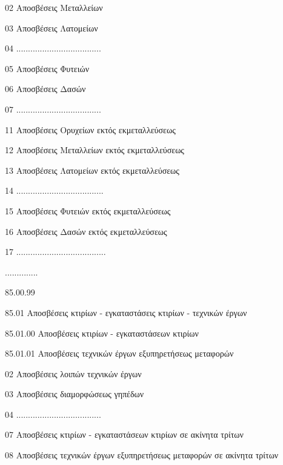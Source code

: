 \documentclass[A4,10pt,greek]{book}
\begin{document}
                               02    Αποσβέσεις Μεταλλείων

                               03    Αποσβέσεις Λατομείων

                               04    ....................................

                               05    Αποσβέσεις Φυτειών

                               06    Αποσβέσεις Δασών

                               07    ....................................

                               11    Αποσβέσεις Ορυχείων εκτός εκμεταλλεύσεως

                               12    Αποσβέσεις Μεταλλείων εκτός εκμεταλλεύσεως

                               13    Αποσβέσεις Λατομείων εκτός εκμεταλλεύσεως

                               14    .....................................

                               15    Αποσβέσεις Φυτειών εκτός εκμεταλλεύσεως

                               16    Αποσβέσεις Δασών εκτός εκμεταλλεύσεως

                               17    ......................................

                    ..............

                    85.00.99

        85.01    Αποσβέσεις κτιρίων - εγκαταστάσεις κτιρίων - τεχνικών έργων

                    85.01.00    Αποσβέσεις κτιρίων - εγκαταστάσεων κτιρίων

                    85.01.01    Αποσβέσεις τεχνικών έργων εξυπηρετήσεως μεταφορών

                               02    Αποσβέσεις λοιπών τεχνικών έργων

                               03    Αποσβέσεις διαμορφώσεως γηπέδων

                               04    ....................................

                               07    Αποσβέσεις κτιρίων - εγκαταστάσεων κτιρίων σε ακίνητα
                                       τρίτων

                               08    Αποσβέσεις τεχνικών έργων εξυπηρετήσεως μεταφορών σε
                                       ακίνητα τρίτων
\end{document}
